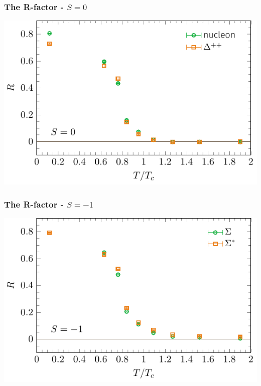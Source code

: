 \documentclass[11pt]{beamer}
\begin{document}
\begin{frame}
  \frametitle{The R-factor - $S = 0$}

  \vspace{6mm}
  \begin{center}
    \hspace*{-5mm}
    \includegraphics[width=\textwidth]{plots/sumR_nucleon.pdf}
  \end{center}

\end{frame}

\begin{frame}
  \frametitle{The R-factor - $S = -1$}

  \vspace{6mm}
  \begin{center}
    \hspace*{-5mm}
    \includegraphics[width=\textwidth]{plots/sumR_s1.pdf}
  \end{center}

\end{frame}
\end{document}

